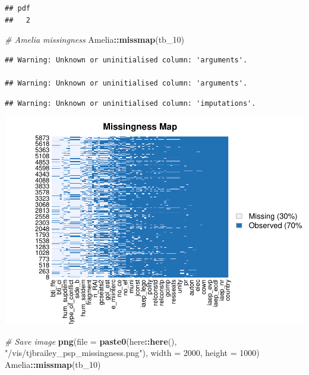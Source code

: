 \documentclass[
]{article}
\newenvironment{Shaded}{\begin{snugshade}}{\end{snugshade}}
\newcommand{\CommentTok}[1]{\textcolor[rgb]{0.56,0.35,0.01}{\textit{#1}}}
\newcommand{\DataTypeTok}[1]{\textcolor[rgb]{0.13,0.29,0.53}{#1}}
\newcommand{\DecValTok}[1]{\textcolor[rgb]{0.00,0.00,0.81}{#1}}
\newcommand{\KeywordTok}[1]{\textcolor[rgb]{0.13,0.29,0.53}{\textbf{#1}}}
\newcommand{\NormalTok}[1]{#1}
\newcommand{\OperatorTok}[1]{\textcolor[rgb]{0.81,0.36,0.00}{\textbf{#1}}}
\newcommand{\StringTok}[1]{\textcolor[rgb]{0.31,0.60,0.02}{#1}}
\begin{document}
\begin{verbatim}
## pdf 
##   2
\end{verbatim}

\begin{Shaded}
\begin{Highlighting}[]
\CommentTok{# Amelia missingness}
\NormalTok{Amelia}\OperatorTok{::}\KeywordTok{missmap}\NormalTok{(tb_}\DecValTok{10}\NormalTok{)}
\end{Highlighting}
\end{Shaded}

\begin{verbatim}
## Warning: Unknown or uninitialised column: 'arguments'.

## Warning: Unknown or uninitialised column: 'arguments'.
\end{verbatim}

\begin{verbatim}
## Warning: Unknown or uninitialised column: 'imputations'.
\end{verbatim}

\includegraphics{01_tjbrailey_wrangle_data_files/figure-latex/unnamed-chunk-14-1.pdf}

\begin{Shaded}
\begin{Highlighting}[]
\CommentTok{# Save image}
\KeywordTok{png}\NormalTok{(}\DataTypeTok{file =} \KeywordTok{paste0}\NormalTok{(here}\OperatorTok{::}\KeywordTok{here}\NormalTok{(), }\StringTok{"/vis/tjbrailey_psp_missingness.png"}\NormalTok{),}
    \DataTypeTok{width =} \DecValTok{2000}\NormalTok{, }
    \DataTypeTok{height =} \DecValTok{1000}\NormalTok{)}
\NormalTok{Amelia}\OperatorTok{::}\KeywordTok{missmap}\NormalTok{(tb_}\DecValTok{10}\NormalTok{)}
\end{Highlighting}
\end{Shaded}
\end{document}
